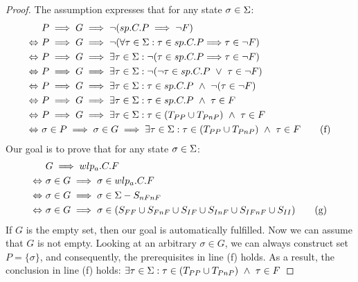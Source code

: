 \begin{proof}
	The assumption expresses that for any state $\sigma\in\S$:
\begin{align*} 
	&\ P\implies G \implies \neg(sp.C.P \implies \neg F) \\ 
	\Leftrightarrow&\ P\implies G \implies \neg(\forall\tau\in\S:\tau\in sp.C.P{\implies}\tau\in\neg F) \\ 
	\Leftrightarrow&\ P\implies G \implies \exists\tau\in\S:\neg(\tau\in sp.C.P{\implies}\tau\in\neg F) \\ 
	\Leftrightarrow&\ P\implies G \implies \exists\tau\in\S:\neg(\neg\tau\in sp.C.P\ \vee\ \tau\in\neg F) \\ 
	\Leftrightarrow&\ P\implies G \implies \exists\tau\in\S:\tau\in sp.C.P\ \wedge\ \neg(\tau\in\neg F) \\ 
	\Leftrightarrow&\ P\implies G \implies \exists\tau\in\S:\tau\in sp.C.P\ \wedge\ \tau\in F \\ 
	\Leftrightarrow&\ P\implies G \implies \exists\tau\in\S:\tau\in (T_{PP}\cup T_{PnP})\ \wedge\ \tau\in F \\ 
	\Leftrightarrow&\ \sigma\in P \implies \sigma\in G \implies \exists\tau\in\S:\tau\in (T_{PP}\cup T_{PnP})\ \wedge\ \tau\in F \tag{f}\\ 
\end{align*}
Our goal is to prove that for any state $\sigma\in\S$:
\begin{align*}
	&\ G\implies wlp_a.C.F \\ 
	\iff&\  \sigma\in G\implies\sigma\in wlp_a.C.F\\
	\iff&\  \sigma\in G\implies\sigma\in \S-S_{nFnF}\\
	\iff&\  \sigma\in G\implies\sigma\in (S_{FF}\cup S_{FnF}\cup S_{IF}\cup S_{InF}\cup S_{IFnF}\cup S_{II}) \tag{g}\\
\end{align*}
If $G$ is the empty set, then our goal is automatically fulfilled. 
Now we can assume that $G$ is not empty. 
Looking at an arbitrary $\sigma\in G$, we can always construct set $P=\{\sigma\}$, and consequently, the prerequisites in line (f) holds. 
As a result, the conclusion in line (f) holds: $\exists\tau\in\S:\tau\in (T_{PP}\cup T_{PnP})\ \wedge\ \tau\in F$


\end{proof}
